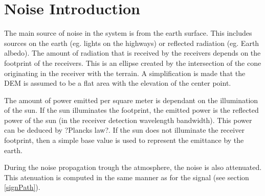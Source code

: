 \section{Noise Introduction}
\label{noise}

The main source of noise in the system is from the earth surface. This includes sources on
the earth (eg. lights on the highways) or reflected radiation (eg. Earth albedo). The amount of
radiation that is received by the receivers depends on the footprint of the  receivers. This is an
ellipse created by the intersection of the cone originating in the receiver with the terrain. A
simplification is made that the \ac{DEM} is assumed to be a flat area with the elevation of the
center point.
 
The amount of power emitted per square meter is dependant on the illumination of the sun. If the sun
illuminates the footprint, the emitted power is the reflected power of the sun (in the receiver
detection wavelength bandwidth). This power can be deduced by ?Plancks law?. If the sun does not
illuminate the receiver footprint, then a simple base value is used to represent the emittance by the earth.

During the noise propagation trough the atmosphere, the noise is also attenuated. This atenuation is
computed in the same manner as for the signal (see section \ref{signPath}).
